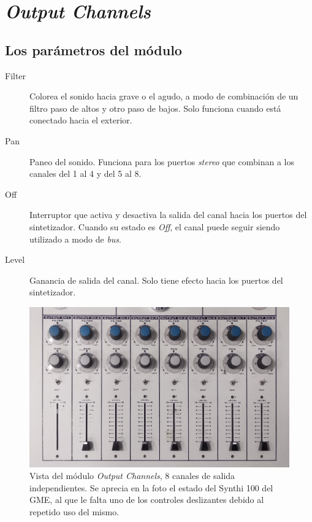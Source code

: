 \section[\textit{Output Channels}]{\textit{Output Channels}}
\label{sec:output_channels}

\subsection{Los parámetros del módulo}

\begin{description}
	\item[Filter] Colorea el sonido hacia grave o el agudo, a modo de combinación de un filtro paso de altos y otro paso de bajos. Solo funciona cuando está conectado hacia el exterior.
	\item[Pan] Paneo del sonido. Funciona para los puertos \textit{stereo} que combinan a los canales del 1 al 4 y del 5 al 8.
	\item[Off] Interruptor que activa y desactiva la salida del canal hacia los puertos del sintetizador. Cuando su estado es \textit{Off}, el canal puede seguir siendo utilizado a modo de \textit{bus}.
	\item[Level] Ganancia de salida del canal. Solo tiene efecto hacia los puertos del sintetizador.
\end{description}

\begin{figure}
	\centering
	\includegraphics[width=1\textwidth]{images/output_channels}
	\caption[\textit{Output Channels}]{Vista del módulo \textit{Output Channels}, 8 canales de salida independientes. Se aprecia en la foto el estado del Synthi 100 del GME, al que le falta uno de los controles deslizantes debido al repetido uso del mismo.}
	\label{fig:output_channels}
\end{figure}

